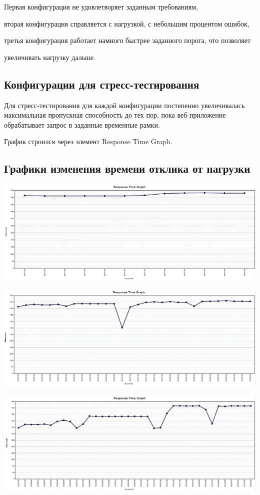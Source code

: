 Первая конфигурация не удовлетворяет заданным требованиям,

вторая конфигурация справляется с нагрузкой, с небольшим процентом ошибок,

третья конфигурация работает намного быстрее заданного порога, что позволяет

увеличивать нагрузку дальше.

\subsection{Конфигурации для стресс-тестирования}
Для стресс-тестирования для каждой конфигурации постепенно увеличивалась
максимальная пропускная способность до тех пор, пока веб-приложение обрабатывает
запрос в заданные временные рамки.

График строился через элемент Response Time Graph.
\subsection{Графики изменения времени отклика от нагрузки}
\includegraphics[width=500bp]{img/stress1.png}

\includegraphics[width=500bp]{img/stress2.png}

\includegraphics[width=500bp]{img/stress3.png}

